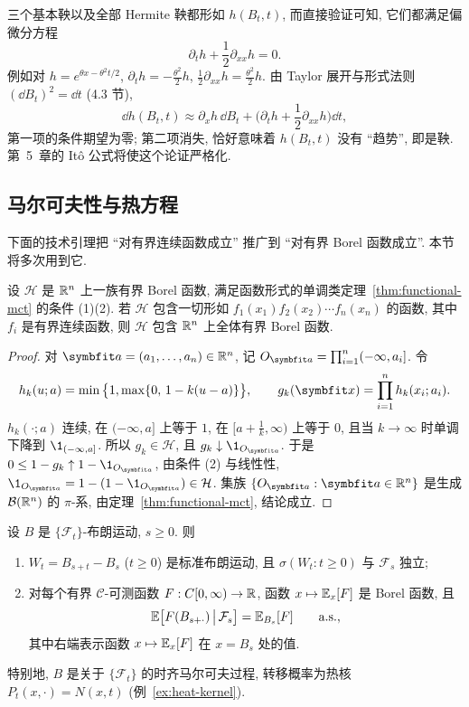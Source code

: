 \begin{intuition}
三个基本鞅以及全部 Hermite 鞅都形如 $h(B_t,t)$, 而直接验证可知, 它们都满足偏微分方程
\[
\partial_th+\frac{1}{2}\partial_{xx}h=0.
\]
例如对 $h=e^{\theta x-\theta^2t/2}$, $\partial_th=-\frac{\theta^2}{2}h$, $\frac{1}{2}\partial_{xx}h=\frac{\theta^2}{2}h$. 由 Taylor 展开与形式法则 $(\dd B_t)^2=\dd t$ (4.3 节),
\[
\dd h(B_t,t)\approx\partial_xh\,\dd B_t+\Big(\partial_th+\frac{1}{2}\partial_{xx}h\Big)\dd t,
\]
第一项的条件期望为零; 第二项消失, 恰好意味着 $h(B_t,t)$ 没有 ``趋势'', 即是鞅. 第~5~章的 It\^o 公式将使这个论证严格化.
\end{intuition}

\subsection{马尔可夫性与热方程}

下面的技术引理把 ``对有界连续函数成立'' 推广到 ``对有界 Borel 函数成立''. 本节将多次用到它.

\begin{lemma}\label{lem:cont-to-borel}
设 $\mathcal{H}$ 是 $\mathbb{R}^n$ 上一族有界 Borel 函数, 满足函数形式的单调类定理~\ref{thm:functional-mct} 的条件 (1)(2). 若 $\mathcal{H}$ 包含一切形如 $f_1(x_1)f_2(x_2)\cdots f_n(x_n)$ 的函数, 其中 $f_i$ 是有界连续函数, 则 $\mathcal{H}$ 包含 $\mathbb{R}^n$ 上全体有界 Borel 函数.
\end{lemma}

\begin{proof}
对 $\rvec{a}=(a_1,\dots,a_n)\in\R^n$, 记 $O_{\rvec{a}}=\prod_{i=1}^n(-\infty,a_i]$. 令
\[
h_k(u;a)=\min\big\{1,\max\{0,\,1-k(u-a)\}\big\},\qquad g_k(\rvec{x})=\prod_{i=1}^nh_k(x_i;a_i).
\]
$h_k(\cdot;a)$ 连续, 在 $(-\infty,a]$ 上等于 $1$, 在 $[a+\frac{1}{k},\infty)$ 上等于 $0$, 且当 $k\to\infty$ 时单调下降到 $\1_{(-\infty,a]}$. 所以 $g_k\in\mathcal{H}$, 且 $g_k\downarrow\1_{O_{\rvec{a}}}$. 于是 $0\le1-g_k\uparrow1-\1_{O_{\rvec{a}}}$, 由条件 (2) 与线性性, $\1_{O_{\rvec{a}}}=1-(1-\1_{O_{\rvec{a}}})\in\mathcal{H}$. 集族 $\{O_{\rvec{a}}:\rvec{a}\in\R^n\}$ 是生成 $\mathcal{B}(\mathbb{R}^n)$ 的 $\pi$-系, 由定理~\ref{thm:functional-mct}, 结论成立.
\end{proof}

\begin{theorem}[布朗运动的马尔可夫性]\label{thm:bm-markov}
设 $B$ 是 $\{\mathcal{F}_t\}$-布朗运动, $s\ge0$. 则
\begin{enumerate}
\item $W_t=B_{s+t}-B_s$ ($t\ge0$) 是标准布朗运动, 且 $\sigma(W_t:t\ge0)$ 与 $\mathcal{F}_s$ 独立;
\item 对每个有界 $\mathcal{C}$-可测函数 $F:C[0,\infty)\to\mathbb{R}$, 函数 $x\mapsto\mathbb{E}_x[F]$ 是 Borel 函数, 且
\begin{equation}\label{eq:markov-path}
\mathbb{E}\big[F(B_{s+\cdot})\,\big|\,\mathcal{F}_s\big]=\mathbb{E}_{B_s}[F]\qquad\text{a.s.},
\end{equation}
其中右端表示函数 $x\mapsto\mathbb{E}_x[F]$ 在 $x=B_s$ 处的值.
\end{enumerate}
特别地, $B$ 是关于 $\{\mathcal{F}_t\}$ 的时齐马尔可夫过程, 转移概率为热核 $P_t(x,\cdot)=N(x,t)$ (例~\ref{ex:heat-kernel}).
\end{theorem}

